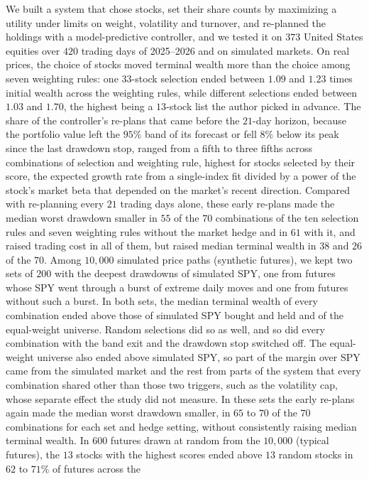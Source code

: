 We built a system that chose stocks, set their share counts by maximizing a utility under limits on weight,
volatility and turnover, and re-planned the holdings with a model-predictive controller, and we tested it on $373$
United States equities over $420$ trading days of 2025--2026 and on simulated markets. On real prices, the choice of
stocks moved terminal wealth more than the choice among seven weighting rules: one $33$-stock selection ended between
$1.09$ and $1.23$ times initial wealth across the weighting rules, while different selections ended between $1.03$
and $1.70$, the highest being a $13$-stock list the author picked in advance. The share of the controller's re-plans that came
before the $21$-day horizon, because the portfolio value left the $95\%$ band of its forecast or fell $8\%$ below its
peak since the last drawdown stop, ranged from a fifth to three fifths across combinations of
selection and weighting rule, highest for stocks selected by their score, the expected growth rate from a
single-index fit divided by a power of the stock's market beta that depended on the market's recent direction.
Compared with re-planning every $21$ trading days alone, these early re-plans made the median worst drawdown smaller
in $55$ of the $70$ combinations of the ten selection rules and seven weighting rules without the market hedge and
in $61$ with it, and raised trading cost in all of them, but raised median terminal wealth in $38$ and $26$ of the
$70$. Among $10{,}000$ simulated price paths (synthetic futures), we kept two sets of $200$ with the
deepest drawdowns of simulated SPY, one from futures whose SPY went through a burst of extreme daily moves and one
from futures without such a burst. In both sets, the median terminal wealth of every combination ended above those
of simulated SPY bought and held and of the equal-weight universe. Random selections did so as well, and so did
every combination with the band exit and the drawdown stop switched off. The equal-weight universe also ended above
simulated SPY, so part of the margin over SPY came from the simulated market and the rest from parts of the system
that every combination shared other than those two triggers, such as the volatility cap, whose separate effect the
study did not measure. In these sets the early re-plans again made the median worst drawdown smaller, in $65$ to
$70$ of the $70$ combinations for each set and hedge setting, without consistently raising median terminal wealth. In $600$ futures drawn at random from the $10{,}000$ (typical futures),
the $13$ stocks with the highest scores ended above $13$ random stocks in $62$ to $71\%$ of futures across the
